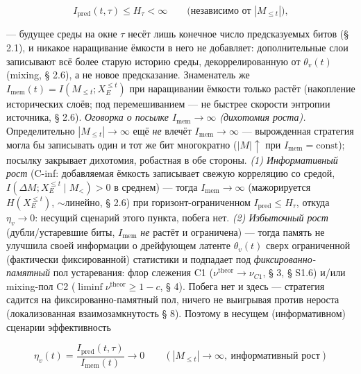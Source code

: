 \documentclass[12pt]{iopart}
\begin{document}
\begin{equation}I_{\text{pred}}(t,\tau) \le H_\tau < \infty \qquad\text{(независимо от }|M_{\le t}|\text{)}, \tag{5.3}\end{equation}



--- будущее среды на окне \(\tau\) несёт лишь конечное число предсказуемых битов (§ 2.1), и никакое наращивание ёмкости в него не добавляет: дополнительные слои записывают всё более старую историю среды, декоррелированную от \(\theta_v(t)\) (mixing, § 2.6), а не новое предсказание. Знаменатель же \(I_{\text{mem}}(t) = I(M_{\le t}; X_E^{\le t})\) при наращивании ёмкости только растёт (накопление исторических слоёв; под перемешиванием --- не быстрее скорости энтропии источника, § 2.6). \emph{Оговорка о посылке \(I_{\text{mem}}\to\infty\) (дихотомия роста).} Определительно \(|M_{\le t}|\to\infty\) ещё \emph{не} влечёт \(I_{\text{mem}}\to\infty\) --- вырожденная стратегия могла бы записывать один и тот же бит многократно (\(|M|\uparrow\) при \(I_{\text{mem}} = \text{const}\)); посылку закрывает дихотомия, робастная в обе стороны. \emph{(1) Информативный рост} (C-inf: добавляемая ёмкость записывает свежую корреляцию со средой, \(I(\Delta M; X_E^{\le t}\mid M_{<}) > 0\) в среднем) --- тогда \(I_{\text{mem}}\to\infty\) (мажорируется \(H(X_E^{\le t})\), \(\sim\)линейно, § 2.6) при горизонт-ограниченном \(I_{\text{pred}} \le H_\tau\), откуда \(\eta_v\to0\): несущий сценарий этого пункта, побега нет. \emph{(2) Избыточный рост} (дубли/устаревшие биты, \(I_{\text{mem}}\) \emph{не} растёт и ограничена) --- тогда память не улучшила своей информации о дрейфующем латенте \(\theta_v(t)\) сверх ограниченной (фактически фиксированной) статистики и подпадает под \emph{фиксированно-памятный} пол устаревания: флор слежения C1 (\(\nu^{\text{theor}}\to\nu_{C1}\), § 3, § S1.6) и/или mixing-пол C2 (\(\liminf\nu^{\text{theor}}\ge1-c\), § 4). Побега нет и здесь --- стратегия садится на фиксированно-памятный пол, ничего не выигрывая против нероста (локализованная взаимозамкнутость § 8). Поэтому в несущем (информативном) сценарии эффективность



\[\eta_v(t) = \frac{I_{\text{pred}}(t,\tau)}{I_{\text{mem}}(t)} \to 0 \qquad (|M_{\le t}| \to \infty,\ \text{информативный рост})\]
\end{document}
